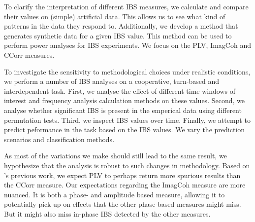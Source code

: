 To clarify the interpretation of different IBS measures, we calculate and
compare their values on (simple) artificial data. This allows us to see what
kind of patterns in the data they respond to. Additionally, we develop a method
that generates synthetic data for a given IBS value. This method can be used
to perform power analyses for IBS experiments. We focus on the PLV, ImagCoh and
CCorr measures.

To investigate the sensitivity to methodological choices under realistic
conditions, we perform a number of IBS analyses on a cooperative, turn-based and
interdependent task. First, we analyse the effect of different time windows of
interest and frequency analysis calculation methods on these values. Second, we
analyse whether significant IBS is present in the emperical data using different
permutation tests. Third, we inspect IBS values over time. Finally, we
attempt to predict peformance in the task based on the IBS values. We
vary the prediction scenarios and classification methods.

As most of the variations we make should still lead to the same result, we
hypothesize that the analysis is robust to such changes in methodology.
Based on \textcite{burgess_interpretation_2013}'s previous work, we
expect PLV to perhaps return more spurious results than the CCorr measure. Our
expectations regarding the ImagCoh measure are more nuanced. It is both a phase-
and amplitude based measure, allowing it to potentially pick up on effects that
the other phase-based measures might miss. But it might also miss in-phase IBS
detected by the other measures.
